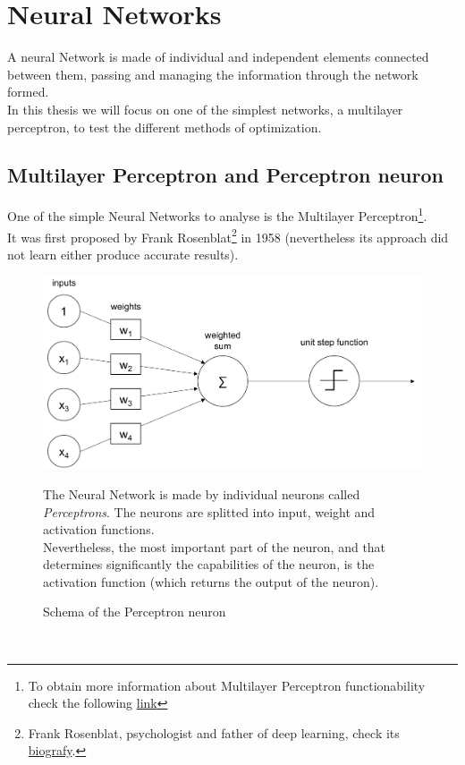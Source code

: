 \documentclass[a4paper, 11pt]{article}
\begin{document}
\newpage
\section{Neural Networks} 
A neural Network is made of individual and independent elements connected between them, passing and managing the information through the network formed.\\
In this thesis we will focus on one of the simplest networks, a multilayer perceptron, to test the different methods of optimization.





\subsection{Multilayer Perceptron and Perceptron neuron}
One of the simple Neural Networks to analyse is the Multilayer Perceptron\footnote{To obtain more information about Multilayer Perceptron functionability check the following \href{https://en.wikipedia.org/wiki/Multilayer_perceptron}{link}}.\\
It was first proposed by Frank Rosenblat\footnote{Frank Rosenblat, psychologist and father of deep learning, check its \href{https://en.wikipedia.org/wiki/Frank_Rosenblat}{biografy}.} in 1958 (nevertheless its approach did not learn either produce accurate results).
\begin{figure}[h]
    \begin{minipage}{9cm}
       \begin{center}
           \includegraphics[width = 1 \textwidth]{Neural_Network/perceptron_schema.png}
           \caption{Schema of the Perceptron neuron}
       \end{center} 
    \end{minipage}
    \hspace{1em}
    \begin{minipage}{5cm}
        The Neural Network is made by individual neurons called \textit{Perceptrons}. The neurons are splitted into input, weight and activation functions.\\
        Nevertheless, the most important part of the neuron, and that determines significantly the capabilities of the neuron, is the activation function (which returns the output of the neuron).
    \end{minipage}
\end{figure}\\
\end{document}
